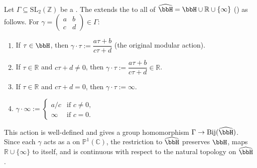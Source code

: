 \begin{definition} \label{definition:modular_action_of_a_subgroup_of_SL_2_Z_on_the_extended_upper_half_plane}
    Let $\Gamma \subseteq \mathrm{SL}_2(\mathbb{Z})$ be a . The  extends the  to all of $\widehat{\bbH} = \bbH \cup \mathbb{R} \cup \{\infty\}$ () as follows. For $\gamma = \begin{pmatrix} a & b \\ c & d \end{pmatrix} \in \Gamma$:
    \begin{enumerate}
      \item If $\tau \in \bbH$, then $\gamma \cdot \tau := \dfrac{a\tau + b}{c\tau + d}$ (the original modular action).
      \item If $\tau \in \mathbb{R}$ and $c\tau + d \neq 0$, then $\gamma \cdot \tau := \dfrac{a\tau + b}{c\tau + d} \in \mathbb{R}$.
      \item If $\tau \in \mathbb{R}$ and $c\tau + d = 0$, then $\gamma \cdot \tau := \infty$.
      \item $\gamma \cdot \infty := \begin{cases} a/c & \text{if } c \neq 0, \\ \infty & \text{if } c = 0. \end{cases}$
    \end{enumerate}
    This action is well-defined and gives a group homomorphism $\Gamma \to \operatorname{Bij}(\widehat{\bbH})$. Since each $\gamma$ acts as a  on $\mathbb{P}^1(\mathbb{C})$, the restriction to $\widehat{\bbH}$ preserves $\bbH$, maps $\mathbb{R} \cup \{\infty\}$ to itself, and is continuous with respect to the natural topology on $\widehat{\bbH}$.
\end{definition}
